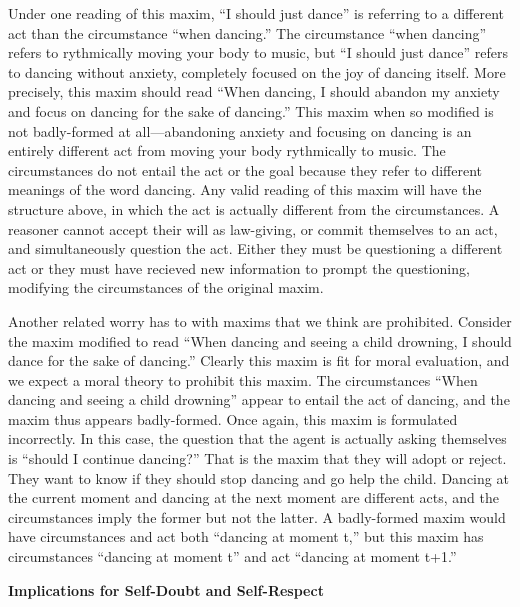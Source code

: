 \begin{isabellebody}
\begin{isamarkuptext}
Under one reading of this maxim, ``I should just dance'' is referring to a different act than the 
circumstance ``when dancing.'' The circumstance ``when dancing'' refers 
to rythmically moving your body to music, but ``I should just dance'' refers to dancing without anxiety, 
completely focused on the joy of dancing itself. More precisely, this maxim should read ``When 
dancing, I should abandon my anxiety and focus on dancing for the sake of dancing.'' This maxim when so 
modified is not badly-formed at all—abandoning anxiety and focusing on dancing is an entirely different act 
from moving your body rythmically to music. The circumstances do not entail the act or the goal because 
they refer to different meanings of the word dancing. Any valid reading of this maxim will have the structure above, 
in which the act is actually different from the circumstances. A reasoner cannot accept their will 
as law-giving, or commit themselves to an act, and simultaneously question the act. Either they must be 
questioning a different act or they must have recieved new information to prompt the questioning, 
modifying the circumstances of the original maxim. 

Another related worry has to with maxims that we think are prohibited. Consider the maxim modified to 
read ``When dancing and seeing a child drowning, I should dance for the sake of dancing.'' Clearly this 
maxim is fit for moral evaluation, and we expect a moral theory to prohibit this maxim. The circumstances 
``When dancing and seeing a child drowning'' appear to entail the act of dancing, and the maxim thus 
appears badly-formed. Once again, this maxim is formulated incorrectly. In this case, the question 
that the agent is actually asking themselves is ``should I continue dancing?'' That is the 
maxim that they will adopt or reject. They want to know if they should stop dancing and go help the child. 
Dancing at the current moment and dancing at the next moment are different acts, and the circumstances 
imply the former but not the latter. A badly-formed maxim would have circumstances and act both 
``dancing at moment t,'' but this maxim has circumstances ``dancing at moment t'' and act ``dancing 
at moment t+1.''

\noindent \textbf{Implications for Self-Doubt and Self-Respect}


\end{isamarkuptext}
\end{isabellebody}
